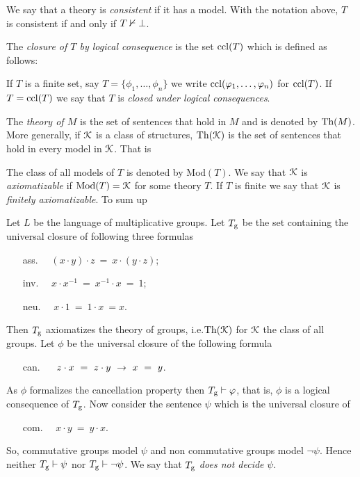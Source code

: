 \documentclass[creche.tex]{subfiles}
\begin{document}
We say that a theory is \emph{consistent\/} if it has a model. With the notation above, $T$ is consistent if and only if \emph{$T\nvdash\bot$}.


The \emph{closure of $T$ by logical consequence\/} is the set ${\rm ccl}(T)$ which is defined as follows:  


If $T$ is a finite set, say $T=\big\{\phi_1,\dots,\phi_n\big\}$ we write ${\rm ccl}(\varphi_1,\dots,\varphi_n)$ for ${\rm ccl}(T)$. If $T={\rm ccl}(T)$ we say that $T$ is \emph{closed under logical consequences}.

The \emph{theory of $M$\/} is the set of sentences that hold in $M$ and is denoted by \emph{$\textrm{Th}(M)$}. More generally, if $\EuScript K$ is a class of structures, \emph{$\textrm{Th}(\EuScript K)$} is the set of sentences that hold in every model in $\EuScript K$. That is


The class of all models of $T$ is denoted by \emph{$\textrm{Mod}(T)$}. We say that $\EuScript K$ is \emph{axiomatizable\/} if $\mathop{\rm Mod}(T)=\EuScript K$ for some theory $T$. If $T$ is finite we say that $\EuScript K$ is \emph{finitely axiomatizable}. To sum up





\begin{example}\label{Tg}
Let $L$ be the language of multiplicative groups. Let $T_{\rm g}$ be the set containing the universal closure of following three formulas
\begin{itemize}
\item[ass.]\ \  $(x\cdot y)\cdot z\ =\ x\cdot(y\cdot z)$;
\item[inv.]\ \  $ x\cdot x^{-1}\ =\ x^{-1}\cdot x\ =\ 1$;
\item[neu.]\ \  $x\cdot 1\ =\ 1\cdot x\ =x$.
\end{itemize}
Then $T_{\rm g}$ axiomatizes the theory of groups, i.e.\@ $\textrm{Th}(\EuScript K)$ for $\EuScript K$ the class of all groups. Let $\phi$ be the universal closure of the following formula
\begin{itemize}
\item[can.]\ \  $\ z\cdot x\ =\  z\cdot y\ \imp\ x\ =\ y$. 
\end{itemize}
As $\phi$ formalizes the cancellation property then $T_{\rm g} \vdash\varphi$, that is, $\phi$ is a logical consequence of $T_{\rm g}$. Now consider the sentence $\psi$ which is the universal closure of
\begin{itemize}
\item[com.]\ \  $x\cdot y\ =\ y\cdot x$. 
\end{itemize}
So, commutative groups model $\psi$ and non commutative groups model $\neg\psi$. Hence neither $T_{\rm g}\vdash\psi$ nor $T_{\rm g}\vdash\neg\psi$. We say that $T_{\rm g}$ \emph{does not decide\/} $\psi$.\QED
\end{example}
\end{document}
